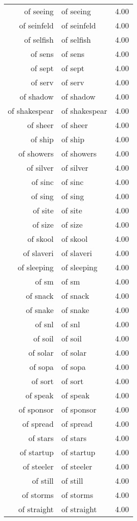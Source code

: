 \begin{table}[ht]
\begin{tabular}{rlr}
  of seeing & of seeing & 4.00 \\ 
  of seinfeld & of seinfeld & 4.00 \\ 
  of selfish & of selfish & 4.00 \\ 
  of sens & of sens & 4.00 \\ 
  of sept & of sept & 4.00 \\ 
  of serv & of serv & 4.00 \\ 
  of shadow & of shadow & 4.00 \\ 
  of shakespear & of shakespear & 4.00 \\ 
  of sheer & of sheer & 4.00 \\ 
  of ship & of ship & 4.00 \\ 
  of showers & of showers & 4.00 \\ 
  of silver & of silver & 4.00 \\ 
  of sinc & of sinc & 4.00 \\ 
  of sing & of sing & 4.00 \\ 
  of site & of site & 4.00 \\ 
  of size & of size & 4.00 \\ 
  of skool & of skool & 4.00 \\ 
  of slaveri & of slaveri & 4.00 \\ 
  of sleeping & of sleeping & 4.00 \\ 
  of sm & of sm & 4.00 \\ 
  of snack & of snack & 4.00 \\ 
  of snake & of snake & 4.00 \\ 
  of snl & of snl & 4.00 \\ 
  of soil & of soil & 4.00 \\ 
  of solar & of solar & 4.00 \\ 
  of sopa & of sopa & 4.00 \\ 
  of sort & of sort & 4.00 \\ 
  of speak & of speak & 4.00 \\ 
  of sponsor & of sponsor & 4.00 \\ 
  of spread & of spread & 4.00 \\ 
  of stars & of stars & 4.00 \\ 
  of startup & of startup & 4.00 \\ 
  of steeler & of steeler & 4.00 \\ 
  of still & of still & 4.00 \\ 
  of storms & of storms & 4.00 \\ 
  of straight & of straight & 4.00 \\ 

\end{tabular}
\end{table}
